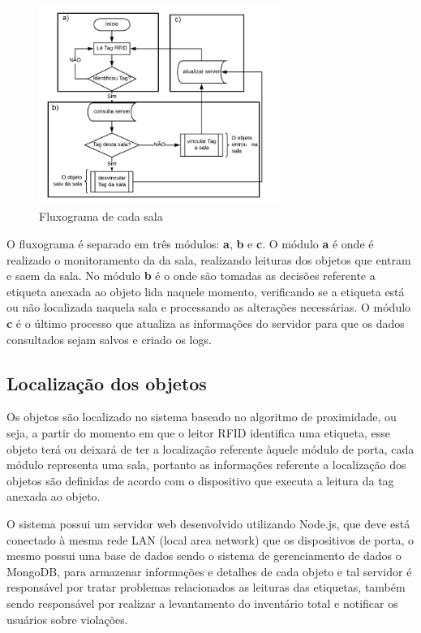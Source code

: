 \begin{figure}[H]
              \caption{\label{fig:fluxograma}{Fluxograma de cada sala}}
              \centering
              \includegraphics[width=0.7\textwidth]{Figuras/fluxograma.png}
\end{figure}

\par
O fluxograma é separado em três módulos: \textbf{a}, \textbf{b} e \textbf{c}. O módulo \textbf{a} é onde é realizado o
monitoramento da da sala, realizando leituras dos objetos que entram e saem da sala. No módulo \textbf{b} é o onde são
tomadas as decisões referente a etiqueta anexada ao objeto lida naquele momento, verificando se a etiqueta está ou não
localizada naquela sala e processando as alterações necessárias. O módulo \textbf{c} é o último processo que atualiza as
informações do servidor para que os dados consultados sejam salvos e criado os logs.


\subsection{Localização dos objetos}

Os objetos são localizado no sistema baseado no algoritmo de proximidade, ou seja, a partir do momento em que o leitor
RFID identifica uma etiqueta, esse objeto terá ou deixará de ter a localização referente àquele módulo de porta, cada módulo representa uma sala, portanto as informações referente a localização  dos objetos são definidas de acordo com o dispositivo que executa a leitura da tag anexada ao objeto.

\par
O sistema possui um servidor web desenvolvido utilizando Node.js, que deve está conectado à mesma rede LAN (local area network) que os dispositivos de porta, o mesmo possui uma base de dados sendo o sistema de gerenciamento de dados o MongoDB, para armazenar informações e detalhes de cada objeto e tal servidor é responsável por tratar problemas relacionados as leituras das  etiquetas, também sendo responsável por realizar a levantamento do inventário total e notificar os usuários sobre violações.

